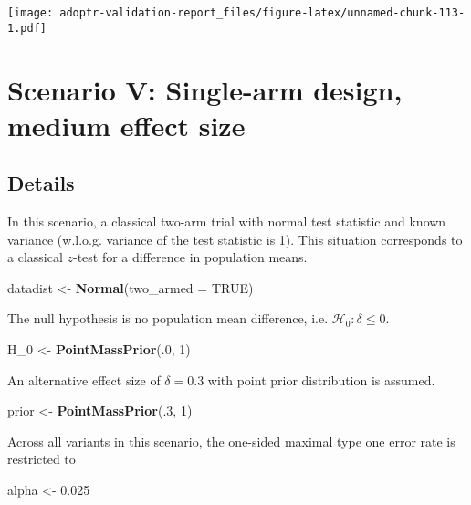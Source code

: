 \documentclass[]{book}
\newenvironment{Shaded}{\begin{snugshade}}{\end{snugshade}}
\newcommand{\DataTypeTok}[1]{\textcolor[rgb]{0.13,0.29,0.53}{#1}}
\newcommand{\DecValTok}[1]{\textcolor[rgb]{0.00,0.00,0.81}{#1}}
\newcommand{\FloatTok}[1]{\textcolor[rgb]{0.00,0.00,0.81}{#1}}
\newcommand{\KeywordTok}[1]{\textcolor[rgb]{0.13,0.29,0.53}{\textbf{#1}}}
\newcommand{\NormalTok}[1]{#1}
\newcommand{\OtherTok}[1]{\textcolor[rgb]{0.56,0.35,0.01}{#1}}
\newcommand{\StringTok}[1]{\textcolor[rgb]{0.31,0.60,0.02}{#1}}
\begin{document}
\texttt{[image: adoptr-validation-report\_files/figure-latex/unnamed-chunk-113-1.pdf]}

\hypertarget{scenarioV}{%
\chapter{Scenario V: Single-arm design, medium effect size}\label{scenarioV}}

\hypertarget{details-4}{%
\section{Details}\label{details-4}}

In this scenario, a classical two-arm trial with normal
test statistic and known variance (w.l.o.g. variance of
the test statistic is 1).
This situation corresponds to a classical \(z\)-test for
a difference in population means.

\begin{Shaded}
\begin{Highlighting}[]
\NormalTok{datadist <-}\StringTok{ }\KeywordTok{Normal}\NormalTok{(}\DataTypeTok{two_armed =} \OtherTok{TRUE}\NormalTok{)}
\end{Highlighting}
\end{Shaded}

The null hypothesis is no population mean difference, i.e.
\(\mathcal{H}_0:\delta \leq 0\).

\begin{Shaded}
\begin{Highlighting}[]
\NormalTok{H_}\DecValTok{0}\NormalTok{ <-}\StringTok{ }\KeywordTok{PointMassPrior}\NormalTok{(.}\DecValTok{0}\NormalTok{, }\DecValTok{1}\NormalTok{)}
\end{Highlighting}
\end{Shaded}

An alternative effect size of \(\delta = 0.3\) with
point prior distribution is assumed.

\begin{Shaded}
\begin{Highlighting}[]
\NormalTok{prior <-}\StringTok{ }\KeywordTok{PointMassPrior}\NormalTok{(.}\DecValTok{3}\NormalTok{, }\DecValTok{1}\NormalTok{)}
\end{Highlighting}
\end{Shaded}

Across all variants in this scenario, the one-sided maximal
type one error rate is restricted to

\begin{Shaded}
\begin{Highlighting}[]
\NormalTok{alpha <-}\StringTok{ }\FloatTok{0.025}
\end{Highlighting}
\end{Shaded}
\end{document}
